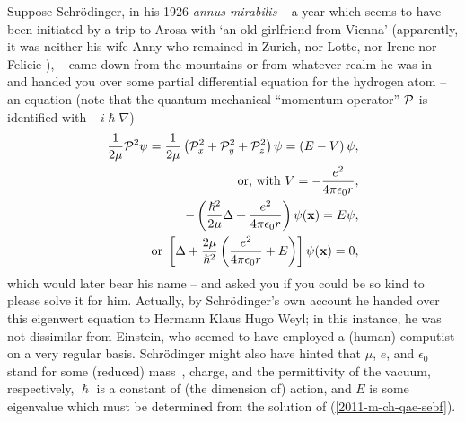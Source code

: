 Suppose Schr\"odinger, in his 1926 {\it annus mirabilis}
--
a year
which seems to have been initiated by a trip to Arosa with `an old girlfriend from Vienna'
(apparently, it was neither his wife Anny who remained in Zurich, nor Lotte, nor Irene nor Felicie \cite{Moore-Schroedinger}),
--
came down from the mountains or from whatever realm he was in -- and
handed you over some partial differential equation  for the hydrogen atom
-- an equation
(note that  the quantum mechanical ``momentum operator'' ${\cal P}$ is identified with  $- i \hslash \nabla$)
\begin{equation}
\begin{split}
  \frac{1}{2\mu } {\cal P} ^2  \psi =\frac{1}{2\mu }\left({\cal P}_x^2 +{\cal P}_y^2 +{\cal P}_z^2\right) \psi = \left( E-V \right)\psi ,\\
\textrm{  or, with } V=-\frac{e^2}{4\pi \epsilon_0 r}, \\
 -\left( \frac{\hslash^2}{2\mu }\Delta +  \frac{e^2}{4\pi \epsilon_0r} \right)\psi ({\bf x})= E\psi, \\
 \textrm{ or }\left[ \Delta + \frac{2\mu }{\hslash^2} \left(\frac{e^2}{4\pi \epsilon_0r} + E \right)\right]\psi ({\bf x})=0,
\end{split}
\label{2011-m-ch-qae-sebf}
\end{equation}
which would later bear his name  -- and asked you if you could be so kind to please solve it for him.
Actually, by Schr\"odinger's own account \cite{ANDP:ANDP19263840404} he handed  over this eigenwert equation to Hermann Klaus Hugo Weyl;
in this instance, he was not dissimilar from Einstein, who seemed to have employed a (human) computist on a very regular basis.
Schr\"odinger might also have hinted that $\mu$, $e$, and $\epsilon_0$ stand for some
(reduced) mass~,
charge, and the  permittivity of the vacuum, respectively,
$\hslash$ is a constant of (the dimension of) action,
and $E$ is some eigenvalue which must be determined from
the solution of (\ref{2011-m-ch-qae-sebf}).

